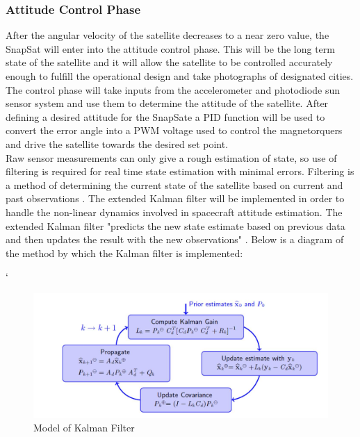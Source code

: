 \subsubsection{Attitude Control Phase}
After the angular velocity of the satellite decreases to a near zero value, the SnapSat will enter into the attitude control phase.  This will be the long term state of the satellite and it will allow the satellite to be controlled accurately enough to fulfill the operational design and take photographs of designated cities.  The control phase will take inputs from the accelerometer and photodiode sun sensor system and use them to determine the attitude of the satellite.  After defining a desired attitude for the SnapSate a PID function will be used to convert the error angle into a PWM voltage used to control the magnetorquers and drive the satellite towards the desired set point.\\
Raw sensor measurements can only give a rough estimation of state, so use of filtering is required for real time state estimation with minimal errors. Filtering is a method of determining the current state of the satellite based on current and past observations \cite{Kalman}.  The extended Kalman filter will be implemented in order to handle the non-linear  dynamics involved in spacecraft attitude estimation.  The extended Kalman filter "predicts the new state estimate based on previous data and then updates the result with the new observations" \cite{Kalman}.  Below is a diagram of the method by which the Kalman filter is implemented:\\
\vspace{-6mm}
\begin{center}`
    \begin{figure}[H]
        \caption{Model of Kalman Filter \cite{Kalman}}
        \vspace{-4mm}
        \centering
        \includegraphics[width=\linewidth]{./figures/Kalman_Model}
    \end{figure}
\end{center}
\vspace{-5mm}
